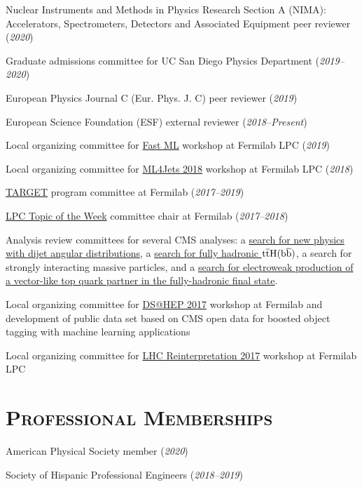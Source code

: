 \documentclass[11pt]{res}
\newcommand{\MarginText}[1]{\section{\textsc{#1}}\vspace{10pt}}
\begin{document}
\begin{resume}
Nuclear Instruments and Methods in Physics Research Section A (NIMA): Accelerators, Spectrometers, Detectors and Associated Equipment peer reviewer (\textit{2020})

Graduate admissions committee for UC San Diego Physics Department (\textit{2019--2020})

European Physics Journal C (Eur. Phys. J. C) peer reviewer (\textit{2019})

European Science Foundation (ESF) external reviewer (\textit{2018--Present})

Local organizing committee for \href{https://indico.cern.ch/e/fml}{Fast ML} workshop at Fermilab LPC (\textit{2019})

Local organizing committee for \href{https://indico.cern.ch/e/ml4jets2018}{ML4Jets 2018} workshop at Fermilab LPC (\textit{2018})

\href{http://diversity.fnal.gov/target/}{TARGET} program committee at Fermilab (\textit{2017--2019})

\href{http://lpc.fnal.gov/programs/topic/}{LPC Topic of the Week} committee chair at Fermilab (\textit{2017--2018})

Analysis review committees for several CMS analyses: a \href{http://arxiv.org/abs/1803.08030}{search for new physics with dijet angular distributions}, a \href{https://arxiv.org/abs/1803.06986}{search for fully hadronic $\mathrm{t}\overline{\mathrm{t}}\mathrm{H}(\mathrm{b}\overline{\mathrm{b}})$}, a search for strongly interacting massive particles, and a \href{https://arxiv.org/abs/1909.04721}{search for electroweak production of a vector-like top quark partner in the fully-hadronic final state}.

Local organizing committee for \href{http://dshep.fnal.gov}{DS@HEP 2017} workshop at Fermilab and development of public data set based on CMS open data for boosted object tagging with machine learning applications

Local organizing committee for \href{https://indico.cern.ch/event/639314/}{LHC Reinterpretation 2017} workshop at Fermilab LPC


\MarginText{Professional Memberships}

American Physical Society member (\textit{2020})

Society of Hispanic Professional Engineers (\textit{2018--2019})




\end{resume}
\end{document}
